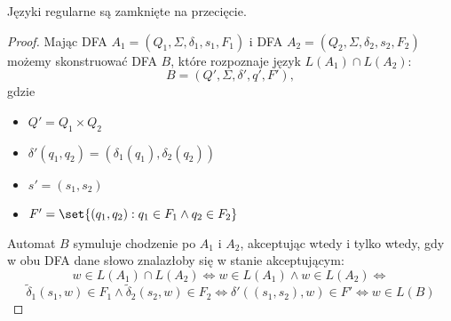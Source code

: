\begin{theorem}
Języki regularne są zamknięte na przecięcie.
\end{theorem}
\begin{proof}
   Mając DFA \(A_1 = (Q_1, \Sigma, \delta_1, s_1, F_1)\) i DFA \(A_2 = (Q_2, \Sigma, \delta_2, s_2, F_2)\) możemy skonstruować DFA \(B\), które rozpoznaje język \(L(A_1) \cap L(A_2)\):
   \[
      B = (Q', \Sigma, \delta', q', F'),
   \]
   gdzie
   \begin{itemize}
      \item \( Q' = Q_1 \times Q_2 \)
      \item \( \delta'(q_1, q_2) = (\delta_1(q_1), \delta_2(q_2)) \)
      \item \( s' = (s_1, s_2) \)
      \item \( F' = \set{(q_1, q_2) : q_1 \in F_1 \land q_2 \in F_2} \)
   \end{itemize}
 
   Automat \(B\) symuluje chodzenie po \(A_1\) i \(A_2\), akceptując wtedy i tylko wtedy, gdy w obu DFA dane słowo znalazłoby się w stanie akceptującym:
   \[ 
      w \in L(A_1) \cap L(A_2) \iff w \in L(A_1) \land w \in L(A_2) \iff  
   \]
   \[ 
      \tilde \delta_1(s_1, w) \in F_1 \land \tilde \delta_2(s_2, w) \in F_2 \iff \delta'((s_1, s_2), w) \in F' \iff w \in L(B) 
   \]
\end{proof}
